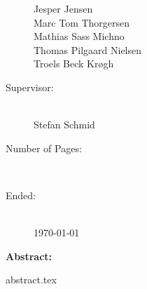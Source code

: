 \begin{titlepage}
\begin{minipage}[t]{0.35\textwidth}
\begin{description}
                Jesper Jensen \\
                Marc Tom Thorgersen \\
                Mathias Sass Michno \\
                Thomas Pilgaard Nielsen \\
                Troels Beck Krøgh
            \item[Supervisor:] \hfill\\
                Stefan Schmid
            \item[Number of Pages:] \hfill\\
                \pageref{LastPage}
            \item[Ended:] \hfill\\
                \today
        \end{description}
    \end{minipage} \hfill
    \begin{minipage}[t]{0.55\textwidth}
        \textbf{Abstract:}\\
        \vspace{-1em}
        \begin{problemstatement}
            {abstract.tex}
        \end{problemstatement}
    \end{minipage}
\end{titlepage}
\restoregeometry
